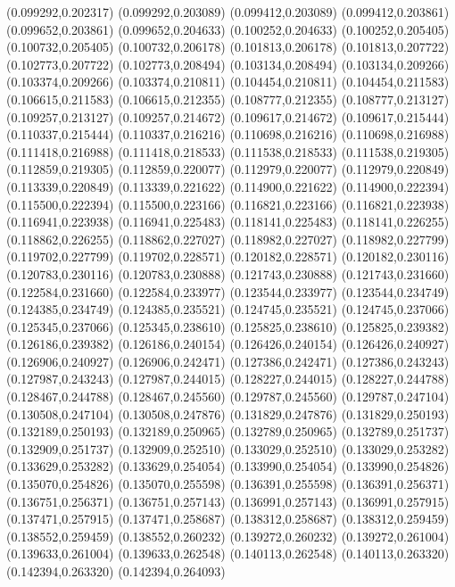 (0.099292,0.202317)
(0.099292,0.203089)
(0.099412,0.203089)
(0.099412,0.203861)
(0.099652,0.203861)
(0.099652,0.204633)
(0.100252,0.204633)
(0.100252,0.205405)
(0.100732,0.205405)
(0.100732,0.206178)
(0.101813,0.206178)
(0.101813,0.207722)
(0.102773,0.207722)
(0.102773,0.208494)
(0.103134,0.208494)
(0.103134,0.209266)
(0.103374,0.209266)
(0.103374,0.210811)
(0.104454,0.210811)
(0.104454,0.211583)
(0.106615,0.211583)
(0.106615,0.212355)
(0.108777,0.212355)
(0.108777,0.213127)
(0.109257,0.213127)
(0.109257,0.214672)
(0.109617,0.214672)
(0.109617,0.215444)
(0.110337,0.215444)
(0.110337,0.216216)
(0.110698,0.216216)
(0.110698,0.216988)
(0.111418,0.216988)
(0.111418,0.218533)
(0.111538,0.218533)
(0.111538,0.219305)
(0.112859,0.219305)
(0.112859,0.220077)
(0.112979,0.220077)
(0.112979,0.220849)
(0.113339,0.220849)
(0.113339,0.221622)
(0.114900,0.221622)
(0.114900,0.222394)
(0.115500,0.222394)
(0.115500,0.223166)
(0.116821,0.223166)
(0.116821,0.223938)
(0.116941,0.223938)
(0.116941,0.225483)
(0.118141,0.225483)
(0.118141,0.226255)
(0.118862,0.226255)
(0.118862,0.227027)
(0.118982,0.227027)
(0.118982,0.227799)
(0.119702,0.227799)
(0.119702,0.228571)
(0.120182,0.228571)
(0.120182,0.230116)
(0.120783,0.230116)
(0.120783,0.230888)
(0.121743,0.230888)
(0.121743,0.231660)
(0.122584,0.231660)
(0.122584,0.233977)
(0.123544,0.233977)
(0.123544,0.234749)
(0.124385,0.234749)
(0.124385,0.235521)
(0.124745,0.235521)
(0.124745,0.237066)
(0.125345,0.237066)
(0.125345,0.238610)
(0.125825,0.238610)
(0.125825,0.239382)
(0.126186,0.239382)
(0.126186,0.240154)
(0.126426,0.240154)
(0.126426,0.240927)
(0.126906,0.240927)
(0.126906,0.242471)
(0.127386,0.242471)
(0.127386,0.243243)
(0.127987,0.243243)
(0.127987,0.244015)
(0.128227,0.244015)
(0.128227,0.244788)
(0.128467,0.244788)
(0.128467,0.245560)
(0.129787,0.245560)
(0.129787,0.247104)
(0.130508,0.247104)
(0.130508,0.247876)
(0.131829,0.247876)
(0.131829,0.250193)
(0.132189,0.250193)
(0.132189,0.250965)
(0.132789,0.250965)
(0.132789,0.251737)
(0.132909,0.251737)
(0.132909,0.252510)
(0.133029,0.252510)
(0.133029,0.253282)
(0.133629,0.253282)
(0.133629,0.254054)
(0.133990,0.254054)
(0.133990,0.254826)
(0.135070,0.254826)
(0.135070,0.255598)
(0.136391,0.255598)
(0.136391,0.256371)
(0.136751,0.256371)
(0.136751,0.257143)
(0.136991,0.257143)
(0.136991,0.257915)
(0.137471,0.257915)
(0.137471,0.258687)
(0.138312,0.258687)
(0.138312,0.259459)
(0.138552,0.259459)
(0.138552,0.260232)
(0.139272,0.260232)
(0.139272,0.261004)
(0.139633,0.261004)
(0.139633,0.262548)
(0.140113,0.262548)
(0.140113,0.263320)
(0.142394,0.263320)
(0.142394,0.264093)
